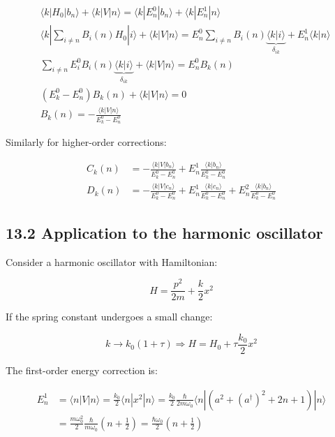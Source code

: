 \documentclass[italian]{HKNdocument}
\begin{document}
\begin{align*}
&\langle k|H_0|b_n\rangle+\langle k|V|n\rangle=\langle k|E_n^0|b_n\rangle+\langle k|E_n^1|n\rangle\\
&\langle k|\sum_{i\neq n}B_i(n)H_0|i\rangle+\langle k|V|n\rangle=E_n^0\sum_{i\neq n}B_i(n)\underbrace{\langle k|i\rangle}_{\delta_{ik}}+E_n^1\langle k|n\rangle\\
&\sum_{i\neq n}E_i^0B_i(n)\underbrace{\langle k|i\rangle}_{\delta_{ik}}+\langle k|V|n\rangle=E_n^0B_k(n) \tag{13.17}\\
&(E_k^0-E_n^0)B_k(n)+\langle k|V|n\rangle=0\\
&B_k(n)=-\frac{\langle k|V|n\rangle}{E_k^0-E_n^0}
\end{align*}

Similarly for higher-order corrections:

\begin{align*}
C_k(n)&=-\frac{\langle k|V|b_n\rangle}{E_k^0-E_n^0}+E_n^1\frac{\langle k|b_n\rangle}{E_k^0-E_n^0} \tag{13.18}\\
D_k(n)&=-\frac{\langle k|V|c_n\rangle}{E_k^0-E_n^0}+E_n^1\frac{\langle k|c_n\rangle}{E_k^0-E_n^0}+E_n^2\frac{\langle k|b_n\rangle}{E_k^0-E_n^0}
\end{align*}

\subsection*{13.2 Application to the harmonic oscillator}
Consider a harmonic oscillator with Hamiltonian:

\begin{equation*}
H=\frac{p^2}{2m}+\frac{k}{2}x^2 \tag{13.19}
\end{equation*}

If the spring constant undergoes a small change:

\begin{equation*}
k\rightarrow k_0(1+\tau)\Rightarrow H=H_0+\tau\frac{k_0}{2}x^2 \tag{13.20}
\end{equation*}

The first-order energy correction is:

\begin{align*}
E_n^1&=\langle n|V|n\rangle=\frac{k_0}{2}\langle n|x^2|n\rangle=\frac{k_0}{2}\frac{\hbar}{2m\omega_0}\langle n|(a^2+(a^\dagger)^2+2n+1)|n\rangle\\
&=\frac{m\omega_0^2}{2}\frac{\hbar}{m\omega_0}(n+\frac{1}{2})=\frac{\hbar\omega_0}{2}(n+\frac{1}{2}) \tag{13.21}
\end{align*}
\end{document}
